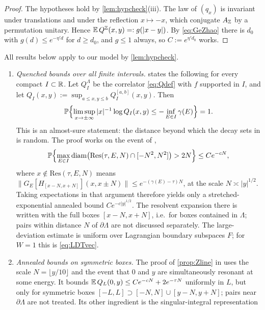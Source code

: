 \begin{proof}
The hypotheses hold by \cref{lem:hypcheck}(iii).  The law of $(q_x)$ is invariant under translations
and under the reflection $x\mapsto-x$, which conjugate $A_{\mathbb{Z}}$ by a permutation unitary.  Hence
$\mathbb{E}\,Q^{\mathbb{Z}}(x,y)=:g(|x-y|)$.  By \eqref{eq:GeZhao} there is $d_0$ with $g(d)\le e^{-\eta'd}$ for $d\ge d_0$,
and $g\le1$ always, so $C:=e^{\eta'd_0}$ works.
\end{proof}

\begin{remark}\label{rem:MSlit}
All results below apply to our model by \cref{lem:hypcheck}.
\begin{enumerate}[label=(\arabic*)]
\item \emph{Quenched bounds over all finite intervals.}  \cite[Thm.~2]{MaceraSodin2022} states the
following for every compact $I\subset\mathbb{R}$.  Let $Q_I^{\Lambda}$ be the correlator \eqref{eq:Qdef} with $f$
supported in $I$, and let $Q_I(x,y):=\sup_{a\le x,y\le b}Q^{[a,b]}_I(x,y)$.  Then
\[
  \mathbb{P}\Bigl\{\limsup_{x\to\pm\infty}|x|^{-1}\log Q_I(x,y)\le-\inf_{E\in I}\gamma(E)\Bigr\}=1 .
\]
This is an
almost-sure statement: the distance beyond which the decay sets in is random.  The proof
\cite[Sect.~2.5]{MaceraSodin2022} works on the event of \cite[Prop.~2.1]{MaceraSodin2022},
\[
  \mathbb{P}\Bigl\{\max_{E\in I}\mathrm{diam}\bigl(\mathrm{Res}(\tau,E,N)\cap[-N^2,N^2]\bigr)>2N\Bigr\}\le Ce^{-cN},
\]
where $x\notin\mathrm{Res}(\tau,E,N)$ means
$\|G_E[H_{[x-N,x+N]}](x,x\pm N)\|\le e^{-(\gamma(E)-\tau)N}$, at the scale $N\asymp|y|^{1/2}$.  Taking
expectations in that argument therefore yields only a stretched-exponential annealed bound
$Ce^{-c|y|^{1/2}}$.  The resolvent expansion there is written with the full boxes $[x-N,x+N]$, i.e.\
for boxes contained in $\Lambda$; pairs within distance $N$ of $\partial\Lambda$ are not discussed
separately.  The large-deviation estimate \cite[Prop.~1.2]{MaceraSodin2022} is uniform over
Lagrangian boundary subspaces $F$; for $W=1$ this is \eqref{eq:LDTvec}.
\item \emph{Annealed bounds on symmetric boxes.}  The proof of \cref{prop:Zline} in
\cite[Sect.~2]{Macera2023} uses the scale $N=\lfloor y/10\rfloor$ and the event that $0$ and $y$ are
simultaneously resonant at some energy.  It bounds $\mathbb{E}\,Q_L(0,y)\le Ce^{-cN}+2e^{-\tau N}$ uniformly
in $L$, but only for symmetric boxes $[-L,L]\supset[-N,N]\cup[y-N,y+N]$; pairs near $\partial\Lambda$
are not treated.  Its other ingredient is the singular-integral representation

\end{enumerate}
\end{remark}
